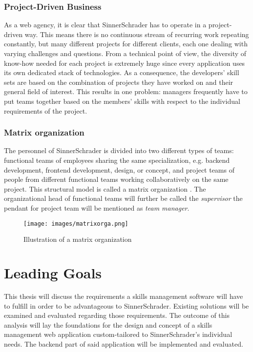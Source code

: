 \subsubsection{Project-Driven Business}
As a web agency, it is clear that SinnerSchrader has to operate in a project-driven way. This means there is no continuous stream of recurring work repeating constantly, but many different projects for different clients, each one dealing with varying challenges and questions. From a technical point of view, the diversity of know-how needed for each project is extremely huge since every application uses its own dedicated stack of technologies. As a consequence, the developers’ skill sets are based on the combination of projects they have worked on and their general field of interest. This results in one problem: managers frequently have to put teams together based on the members’ skills with respect to the individual requirements of the project.

\subsubsection{Matrix organization}
The personnel of SinnerSchrader is divided into two different types of teams: functional teams of
employees sharing the same specialization, e.g. backend development, frontend development, design, or concept, and project teams of people from different functional teams working collaboratively on the same project. This structural model is called a matrix organization \cite[P. 75]{BWL}.
The organizational head of functional teams will further be called the \textit{supervisor} the pendant for project team will be mentioned as \textit{team manager}.

\begin{figure}[!htp]
    \centering
    \texttt{[image: images/matrixorga.png]}
    \caption[Diagram: Matrix organization]{Illustration of a matrix organization}
    \label{fig:matrixorga}
\end{figure}



\section{Leading Goals}
This thesis will discuss the requirements a skills management software will have to fulfill in order to be advantageous to SinnerSchrader. Existing solutions will be examined and evaluated regarding those requirements. The outcome of this analysis will lay the foundations for the design and concept of a skills management web application custom-tailored to SinnerSchrader's individual needs. The backend part of said application will be implemented and evaluated.
